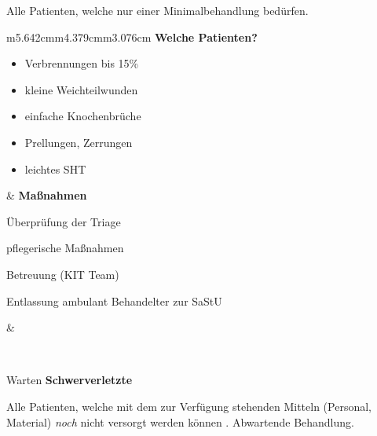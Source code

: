 \documentclass{article}
\newcommand\gEs[1]{\textbf{\textcolor[rgb]{0.0,0.0,0.5019608}{#1}}}
\newcommand\gEs[1]{\textbf{\textcolor[rgb]{0.0,0.0,0.5019608}{#1}}}
\newcommand\gE[1]{\textit{#1}}
\begin{document}
{\mdseries
Alle Patienten, welche nur einer Minimalbehandlung bed\"urfen. }

\begin{flushleft}
\tablehead{}\begin{supertabular}{m{5.642cm}m{4.379cm}m{3.076cm}}
{\mdseries \gEs{Welche Patienten?}}

\begin{itemize}
\item {\mdseries Verbrennungen bis 15\%}

\item {\mdseries kleine Weichteilwunden}

\item {\mdseries einfache Knochenbr\"uche}

\item {\mdseries Prellungen, Zerrungen}

\item {\mdseries leichtes SHT}

\end{itemize}
 &
{\mdseries \gEs{Ma{\ss}nahmen}}

{\mdseries \"Uberpr\"ufung der Triage}

{\mdseries pflegerische Ma{\ss}nahmen}

{\mdseries Betreuung (KIT Team)}

{\mdseries Entlassung ambulant Behandelter zur SaStU}

 &
{%
 \par}

\\
\end{supertabular}
\end{flushleft}
{\mdseries\color{black}
Warten \gEs{Schwerverletzte}}

{\mdseries
Alle Patienten, welche mit dem zur Verf\"ugung stehenden Mitteln
(Personal, Material) \gE{noch} nicht versorgt werden
k\"onnen . Abwartende Behandlung. }
\end{document}

